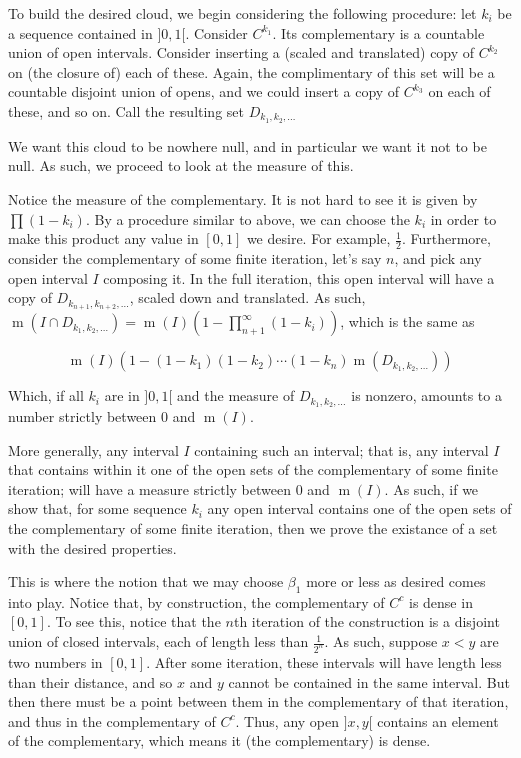 \documentclass{article}
\DeclareMathOperator{\m}{m}
\begin{document}
	To build the desired cloud, we begin considering the following procedure: let $k_i$ be a sequence contained in $]0,1[$. Consider $C^{k_1}$. Its complementary is a countable union of open intervals. Consider inserting a (scaled and translated) copy of $C^{k_2}$ on (the closure of) each of these. Again, the complimentary of this set will be a countable disjoint union of opens, and we could insert a copy of $C^{k_3}$ on each of these, and so on. Call the resulting set $D_{k_1, k_2, \ldots}$
	
	We want this cloud to be nowhere null, and in particular we want it not to be null. As such, we proceed to look at the measure of this.
	
	Notice the measure of the complementary. It is not hard to see it is given by $\prod (1 - k_i)$. By a procedure similar to above, we can choose the $k_i$ in order to make this product any value in $[0,1]$ we desire. For example, $\frac 1 2$. Furthermore, consider the complementary of some finite iteration, let's say $n$, and pick any open interval $I$ composing it. In the full iteration, this open interval will have a copy of $D_{k_{n+1}, k_{n+2}, \ldots}$, scaled down and translated. As such, $\m(I \cap D_{k_1, k_2, \ldots}) = \m(I) (1 - \prod_{n+1}^\infty (1 - k_i))$, which is the same as
	
	\[\m(I) (1 - (1 - k_1)(1-k_2)\cdots(1-k_n) \m(D_{k_1, k_2, \ldots}))\]
	
	Which, if all $k_i$ are in $]0,1[$ and the measure of $D_{k_1, k_2, \ldots}$ is nonzero, amounts to a number strictly between 0 and $\m(I)$.
	
	More generally, any interval $I$ containing such an interval; that is, any interval $I$ that contains within it one of the open sets of the complementary of some finite iteration; will have a measure strictly between 0 and $\m(I)$. As such, if we show that, for some sequence $k_i$ any open interval contains one of the open sets of the complementary of some finite iteration, then we prove the existance of a set with the desired properties.
	
	This is where the notion that we may choose $\beta_1$ more or less as desired comes into play. Notice that, by construction, the complementary of $C^c$ is dense in $[0,1]$. To see this, notice that the $n$th iteration of the construction is a disjoint union of closed intervals, each of length less than $\frac 1 {2^n}$. As such, suppose $x < y$ are two numbers in $[0,1]$. After some iteration, these intervals will have length less than their distance, and so $x$ and $y$ cannot be contained in the same interval. But then there must be a point between them in the complementary of that iteration, and thus in the complementary of $C^c$. Thus, any open $]x,y[$ contains an element of the complementary, which means it (the complementary) is dense.
	
\end{document}
